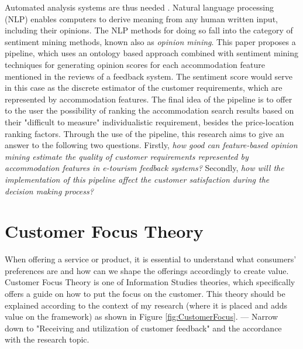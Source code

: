 Automated analysis systems are thus needed \cite{liu2012sentiment}. Natural language processing (NLP) enables computers to derive meaning from any human written input, including their opinions. The NLP methods for doing so fall into the category of sentiment mining methods, known also as \textit{opinion mining}. 
This paper proposes a pipeline, which uses an ontology based approach combined with sentiment mining techniques for generating opinion scores for each accommodation feature mentioned in the reviews of a feedback system. The sentiment score would serve in this case as the discrete estimator of the customer requirements, which are represented by accommodation features. 
The final idea of the pipeline is to offer to the user the possibility of ranking the accommodation search results based on their "difficult to measure" individualistic requirement, besides the price-location ranking factors. 
Through the use of the pipeline, this research aims to give an answer to the following two questions. Firstly, \textit{how good can feature-based opinion mining estimate the quality of customer requirements represented by accommodation features in e-tourism feedback systems?} Secondly, \textit{how will the implementation of this pipeline affect the customer satisfaction during the decision making process?} 

\section{Customer Focus Theory}
\label{sec:CFTH}

When offering a service or product, it is essential to understand what consumers' preferences are and how can we shape the offerings accordingly to create value. Customer Focus Theory is one of Information Studies theories, which specifically offers a guide on how to put the focus on the customer. This theory should be explained according to the context of my research (where it is placed and adds value on the framework) as shown in Figure \ref{fig:CustomerFocus}. 
--- Narrow down to "Receiving and utilization of customer feedback" and the accordance with the research topic.

